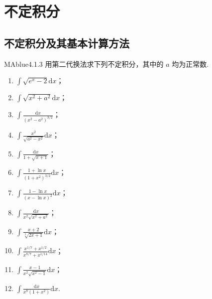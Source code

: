 \chapter{不定积分}

\section{不定积分及其基本计算方法}

\begin{problem}{MAblue}{4.1.3}
    用第二代换法求下列不定积分，其中的 $a$ 均为正常数.
    \begin{multicols}{2}
        \begin{enumerate}
            \item[(1)]
            $\displaystyle \int \sqrt{e^x - 2} \mathrm dx$；
            \item[(2)]
            $\displaystyle \int \sqrt{x^2 + a^2} \mathrm dx$；
            \item[(3)]
            $\displaystyle \int \frac{\mathrm dx}{(x^2-a^2)^{3/2}}$；
            \item[(4)]
            $\displaystyle \int \frac{x^2}{\sqrt{a^2-x^2}} \mathrm dx$；
            \item[(5)]
            $\displaystyle \int \frac{\mathrm dx}{1+\sqrt{x+1}}$；
            \item[(6)]
            $\displaystyle \int \frac{1+\ln x}{(1+x^2)^{3/2}} \mathrm dx$；
            \item[(7)]
            $\displaystyle \int \frac{1-\ln x}{(x - \ln x)^2} \mathrm dx$；
            \item[(8)]
            $\displaystyle \int \frac{\mathrm dx}{x^2\sqrt{x^2+a^2}}$；
            \item[(9)]
            $\displaystyle \int \frac{x+2}{\sqrt[3]{2x+1}} \mathrm dx$；
            \item[(10)]
            $\displaystyle \int \frac{x^{1/7}+x^{1/2}}{x^{8/7}+x^{1/14}} \mathrm dx$；
            \item[(11)]
            $\displaystyle \int \frac{x-1}{x^2\sqrt{x^2-1}} \mathrm dx$；
            \item[(12)]
            $\displaystyle \int \frac{\mathrm dx}{x^8(1+x^2)} \mathrm dx$.
        \end{enumerate}
    \end{multicols}
\end{problem}

